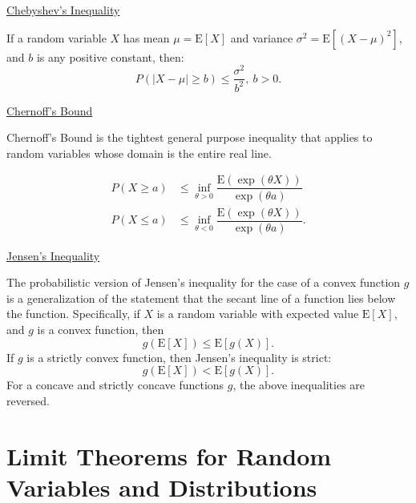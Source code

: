 \documentclass[graybox,envcountchap,sectrefs]{svmono}\usepackage[]{graphicx}\usepackage[]{xcolor}
\begin{document}
\begin{appendices}
\uline{Chebyshev's Inequality}

If a random variable $X$ has mean $\mu=\mathrm{E}\left[X\right]$
and variance $\sigma^{2}=\mathrm{E}\left[(X-\mu)^{2}\right]$, and
$b$ is any positive constant, then:
\begin{equation}
P\left(\left|X-\mu\right|\geqslant b\right)\leqslant\dfrac{\sigma^{2}}{b^{2}},\ b>0.\label{eq: ChebyshevInequalityAppB}
\end{equation}

\uline{Chernoff's Bound}

Chernoff's Bound is the tightest general purpose inequality that applies
to random variables whose domain is the entire real line.

\begin{subequations}
\begin{align}
P(X\geqslant a) & \leqslant\underset{\theta>0}{\inf}\dfrac{\mathrm{E}(\exp\left(\theta X\right))}{\exp\left(\theta a\right)}\label{eq: ChernoffsBound1}\\
P(X\leqslant a) & \leqslant\underset{\theta<0}{\inf}\dfrac{\mathrm{E}(\exp\left(\theta X\right))}{\exp\left(\theta a\right)}.\label{eq:ChernoffsBound2}
\end{align}
\end{subequations}

\uline{Jensen's Inequality}

The probabilistic version of Jensen's inequality for the case of a
convex function $g$ is a generalization of the statement that the
secant line of a function lies below the function. Specifically, if
$X$ is a random variable with expected value $\mathrm{E}\left[X\right]$,
and $g$ is a convex function, then
\begin{equation}
g\left(\mathrm{E}\left[X\right]\right)\leqslant\mathrm{E}\left[g(X)\right].\label{eq: JensenInequalityConvexFnc}
\end{equation}
If $g$ is a strictly convex function, then Jensen's inequality is
strict:
\begin{equation}
g\left(\mathrm{E}\left[X\right]\right)<\mathrm{E}\left[g(X)\right].\label{eq: JensenInequalityStrictlyConvexFnc}
\end{equation}
For a concave and strictly concave functions $g$, the above inequalities
are reversed.

\section{Limit Theorems for Random Variables and Distributions}


\end{appendices}
\end{document}
